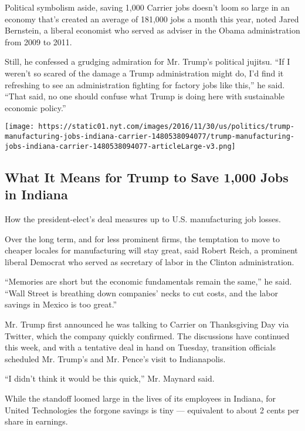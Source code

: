 Political symbolism aside, saving 1,000 Carrier jobs doesn't loom so
large in an economy that's created an average of 181,000 jobs a month
this year, noted Jared Bernstein, a liberal economist who served as
adviser in the Obama administration from 2009 to 2011.

Still, he confessed a grudging admiration for Mr. Trump's political
jujitsu. ``If I weren't so scared of the damage a Trump administration
might do, I'd find it refreshing to see an administration fighting for
factory jobs like this,'' he said. ``That said, no one should confuse
what Trump is doing here with sustainable economic policy.''

\href{https://www.nytimes.com/interactive/2016/11/30/us/politics/trump-manufacturing-jobs-indiana-carrier.html}{}

\texttt{[image: https://static01.nyt.com/images/2016/11/30/us/politics/trump-manufacturing-jobs-indiana-carrier-1480538094077/trump-manufacturing-jobs-indiana-carrier-1480538094077-articleLarge-v3.png]}

\hypertarget{what-it-means-for-trump-to-save-1000-jobs-in-indiana}{%
\subsection{What It Means for Trump to Save 1,000 Jobs in
Indiana}\label{what-it-means-for-trump-to-save-1000-jobs-in-indiana}}

How the president-elect's deal measures up to U.S. manufacturing job
losses.

Over the long term, and for less prominent firms, the temptation to move
to cheaper locales for manufacturing will stay great, said Robert Reich,
a prominent liberal Democrat who served as secretary of labor in the
Clinton administration.

``Memories are short but the economic fundamentals remain the same,'' he
said. ``Wall Street is breathing down companies' necks to cut costs, and
the labor savings in Mexico is too great.''

Mr. Trump first announced he was talking to Carrier on Thanksgiving Day
via Twitter, which the company quickly confirmed. The discussions have
continued this week, and with a tentative deal in hand on Tuesday,
transition officials scheduled Mr. Trump's and Mr. Pence's visit to
Indianapolis.

``I didn't think it would be this quick,'' Mr. Maynard said.

While the standoff loomed large in the lives of its employees in
Indiana, for United Technologies the forgone savings is tiny ---
equivalent to about 2 cents per share in earnings.

